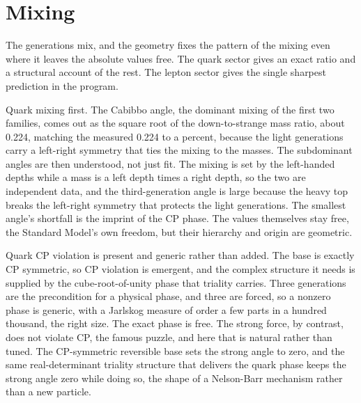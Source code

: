 \section{Mixing}

The generations mix, and the geometry fixes the pattern of the mixing even where it leaves the absolute values free.
The quark sector gives an exact ratio and a structural account of the rest. The lepton sector gives the single sharpest
prediction in the program.

Quark mixing first. The Cabibbo angle, the dominant mixing of the first two families, comes out as the square root of
the down-to-strange mass ratio, about 0.224, matching the measured 0.224 to a percent, because the light generations
carry a left-right symmetry that ties the mixing to the masses. The subdominant angles are then understood, not just
fit. The mixing is set by the left-handed depths while a mass is a left depth times a right depth, so the two are
independent data, and the third-generation angle is large because the heavy top breaks the left-right symmetry that
protects the light generations. The smallest angle's shortfall is the imprint of the CP phase. The values themselves
stay free, the Standard Model's own freedom, but their hierarchy and origin are geometric.

Quark CP violation is present and generic rather than added. The base is exactly CP symmetric, so CP violation is
emergent, and the complex structure it needs is supplied by the cube-root-of-unity phase that triality carries. Three
generations are the precondition for a physical phase, and three are forced, so a nonzero phase is generic, with a
Jarlskog measure of order a few parts in a hundred thousand, the right size. The exact phase is free. The strong force,
by contrast, does not violate CP, the famous puzzle, and here that is natural rather than tuned. The CP-symmetric
reversible base sets the strong angle to zero, and the same real-determinant triality structure that delivers the quark
phase keeps the strong angle zero while doing so, the shape of a Nelson-Barr mechanism rather than a new particle.

